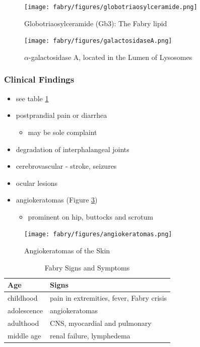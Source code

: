 \documentclass[12pt]{scrartcl}
\begin{document}
\begin{figure}[htbp]
\centering
\texttt{[image: fabry/figures/globotriaosylceramide.png]}
\caption[Globotriaosylceramide]{\label{fig:orgc39fad4}Globotriaosylceramide (Gb3): The Fabry lipid}
\end{figure}

\begin{figure}[htbp]
\centering
\texttt{[image: fabry/figures/galactosidaseA.png]}
\caption[\(\alpha\)-galactosidase A]{\label{fig:orgebd68fb}\(\alpha\)-galactosidase A, located in the Lumen of Lysosomes}
\end{figure}


\subsubsection{Clinical Findings}
\label{sec:org32f4b83}
\begin{itemize}
\item see table \ref{tab:org7fbb6e4}
\item postprandial pain or diarrhea
\begin{itemize}
\item may be sole complaint
\end{itemize}
\item degradation of interphalangeal joints
\item cerebrovascular - stroke, seizures
\item ocular lesions
\item angiokeratomas (Figure \ref{fig:org1597679})
\begin{itemize}
\item prominent on hip, buttocks and scrotum
\end{itemize}
\end{itemize}

\begin{figure}[htbp]
\centering
\texttt{[image: fabry/figures/angiokeratomas.png]}
\caption[Angiokeratomas of the skin]{\label{fig:org1597679}Angiokeratomas of the Skin}
\end{figure}

\begin{table}[htbp]
\caption{\label{tab:org7fbb6e4}Fabry Signs and Symptoms}
\centering
\begin{tabular}{ll}
Age & Signs\\
\hline
childhood & pain in extremities, fever, Fabry crisis \footnotemark\\
adolescence & angiokeratomas\\
adulthood & CNS, myocardial and pulmonary\\
middle age & renal failure, lymphedema\\
\end{tabular}
\end{table}
\end{document}
